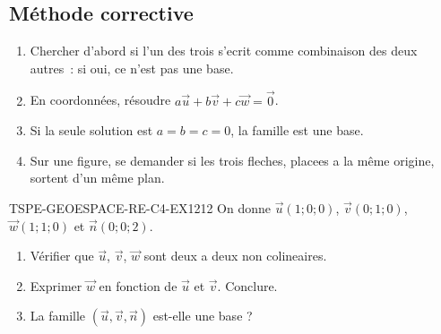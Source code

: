 \subsection*{Méthode corrective}

\begin{enumerate}
  \item Chercher d'abord si l'un des trois s'ecrit comme combinaison des deux
        autres~: si oui, ce n'est pas une base.
  \item En coordonnées, résoudre $a\vec{u}+b\vec{v}+c\vec{w}=\vec{0}$.
  \item Si la seule solution est $a=b=c=0$, la famille est une base.
  \item Sur une figure, se demander si les trois fleches, placees a la même
        origine, sortent d'un même plan.
\end{enumerate}


\begin{exercice}{TSPE-GEOESPACE-RE-C4-EX1}{2}{12}
On donne $\vec{u}(1;0;0)$, $\vec{v}(0;1;0)$, $\vec{w}(1;1;0)$ et
$\vec{n}(0;0;2)$.
\begin{enumerate}
  \item Vérifier que $\vec{u}$, $\vec{v}$, $\vec{w}$ sont deux a deux non
        colineaires.
  \item Exprimer $\vec{w}$ en fonction de $\vec{u}$ et $\vec{v}$. Conclure.
  \item La famille $(\vec{u},\vec{v},\vec{n})$ est-elle une base ?
\end{enumerate}
\end{exercice}


